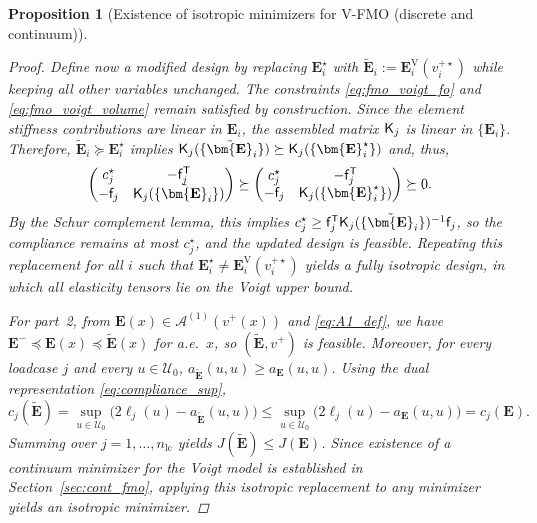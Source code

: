 \documentclass[preprint,3p]{elsarticle}
\newcommand{\tens}[1]{\bm{\mathit{#1}}}             %
\newcommand{\tensf}[1]{\bm{\mathbf{#1}}}            %
\newcommand{\trn}{\mathsf{T}}                       %
\newcommand{\Ei}{\tensf{E}_i}                       %
\newcommand{\EVs}{\tensf{E}_i^{\mathrm{V}}(v_i^{+\star})}   %
\newcommand{\Emin}{\tensf{E}^{-}}                   %
\newcommand{\nlc}{n_\mathrm{lc}}                    %
\newcommand{\semtrx}[1]{\ifcat\noexpand#1\relax\bm{#1}\else\mathsf{#1}\fi}
\newcommand{\sevek}[1]{\ifcat\noexpand#1\relax\bm{#1}\else\mathsf{#1}\fi}
\newtheorem{proposition}{Proposition}[section]
\begin{document}
\begin{proposition}[Existence of isotropic minimizers for V-FMO (discrete and continuum)]
\begin{proof}
Define now a modified design by replacing $\Ei^\star$ with $\tilde{\tensf{E}}_i := \EVs$ while keeping all other variables unchanged. The constraints \eqref{eq:fmo_voigt_fo} and \eqref{eq:fmo_voigt_volume} remain satisfied by construction. Since the element stiffness contributions are linear in $\Ei$, the assembled matrix $\semtrx K_j$ is linear in $\{\Ei\}$. Therefore, $\tilde{\tensf{E}}_i\succeq \Ei^\star$ implies $\semtrx K_j(\{\tilde{\tensf{E}}_i\})\succeq \semtrx K_j(\{\Ei^\star\})$ and, thus,
%
\begin{equation}
\begin{pmatrix}
    c_j^\star & -\sevek{f}_j^\trn \\
    -\sevek{f}_j & \semtrx{K}_j(\{\tilde{\tensf{E}}_i\})
\end{pmatrix}
\succeq
\begin{pmatrix}
    c_j^\star & -\sevek{f}_j^\trn \\
    -\sevek{f}_j & \semtrx{K}_j(\{\Ei^\star\})
\end{pmatrix}
\succeq 0.
\end{equation}
%
By the Schur complement lemma, this implies $c_j^\star \ge \sevek{f}_j^\trn \semtrx{K}_j(\{\tilde{\tensf{E}}_i\})^{-1} \sevek{f}_j$, so the compliance remains at most $c_j^\star$, and the updated design is feasible. Repeating this replacement for all $i$ such that $\Ei^\star \neq \EVs$ yields a fully isotropic design, in which all elasticity tensors lie on the Voigt upper bound.

For part~2, from $\tensf E(\tens x)\in \mathcal A^{(1)}(v^+(\tens x))$ and \eqref{eq:A1_def}, we have $\Emin\preceq \tensf E(\tens x)\preceq \widetilde{\tensf E}(\tens x)$ for a.e.\ $\tens x$, so $(\widetilde{\tensf E},v^+)$ is feasible. Moreover, for every loadcase $j$ and every $\tens u\in\mathcal U_0$, $a_{\widetilde{\tensf E}}(\tens u,\tens u)\ge a_{\tensf E}(\tens u,\tens u)$. Using the dual representation \eqref{eq:compliance_sup},
%
\begin{equation}
c_j(\widetilde{\tensf E})
=\sup_{\tens u\in\mathcal U_0}\big(2\ell_j(\tens u)-a_{\widetilde{\tensf E}}(\tens u,\tens u)\big)
\le
\sup_{\tens u\in\mathcal U_0}\big(2\ell_j(\tens u)-a_{\tensf E}(\tens u,\tens u)\big)
=c_j(\tensf E).
\end{equation}
%
Summing over $j=1,\dots,\nlc$ yields $J(\widetilde{\tensf E})\le J(\tensf E)$. Since existence of a continuum minimizer for the Voigt model is established in Section~\ref{sec:cont_fmo}, applying this isotropic replacement to any minimizer yields an isotropic minimizer.
\end{proof}
\end{proposition}
\end{document}
